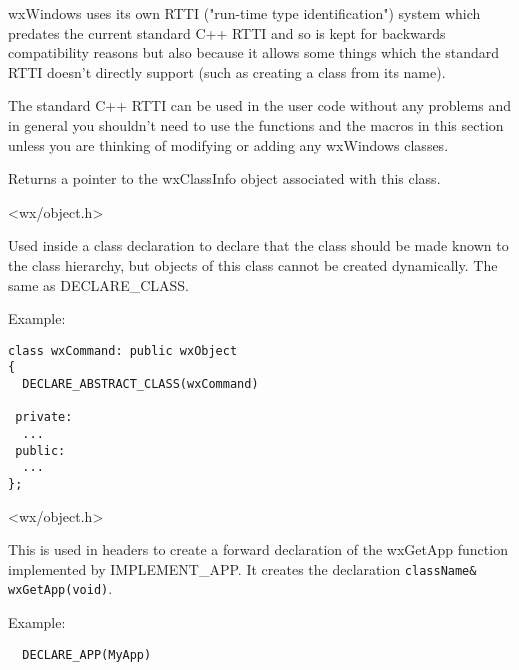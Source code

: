 wxWindows uses its own RTTI ("run-time type identification") system which
predates the current standard C++ RTTI and so is kept for backwards
compatibility reasons but also because it allows some things which the
standard RTTI doesn't directly support (such as creating a class from its
name).

The standard C++ RTTI can be used in the user code without any problems and in
general you shouldn't need to use the functions and the macros in this section
unless you are thinking of modifying or adding any wxWindows classes.



\label{classinfo}


Returns a pointer to the wxClassInfo object associated with this class.


<wx/object.h>

\label{declareabstractclass}


Used inside a class declaration to declare that the class should be
made known to the class hierarchy, but objects of this class cannot be created
dynamically. The same as DECLARE\_CLASS.

Example:

\begin{verbatim}
class wxCommand: public wxObject
{
  DECLARE_ABSTRACT_CLASS(wxCommand)

 private:
  ...
 public:
  ...
};
\end{verbatim}


<wx/object.h>

\label{declareapp}


This is used in headers to create a forward declaration of the wxGetApp function implemented
by IMPLEMENT\_APP. It creates the declaration {\tt className\& wxGetApp(void)}.

Example:

\begin{verbatim}
  DECLARE_APP(MyApp)
\end{verbatim}

